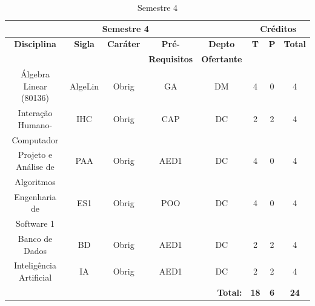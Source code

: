 \begin{table}[H]
\caption{Semestre 4}
\centering
\footnotesize
\begin{tabular}{|c|c|c|c|c|c|c|c|} %
\hline
\hline
\multicolumn{5}{|c|}{\textbf{Semestre 4}}  &  \multicolumn{3}{|c|}{\textbf{Créditos}} \\
\hline
\hline
\textbf{Disciplina} & \textbf{Sigla} & \textbf{Caráter} & \textbf{Pré-} & \textbf{Depto} &  \textbf{T}  &  \textbf{P}  & \textbf{Total} \\ 
& & & \textbf{Requisitos}  & \textbf{Ofertante} & & & \\
\hline 
Álgebra Linear (80136) & AlgeLin & Obrig & GA & DM  & 4 & 0 & 4 \\
\hline

Interação Humano- & IHC & Obrig & CAP & DC & 2 & 2 & 4 \\
Computador & & & & & & & \\

\hline
Projeto e Análise de & PAA & Obrig & AED1 & DC  & 4 & 0 & 4 \\
Algoritmos & & & & & & & \\
\hline
Engenharia de  & ES1 & Obrig & POO & DC  & 4 & 0 & 4 \\
Software 1 & & & & & & & \\
\hline
Banco de Dados & BD & Obrig & AED1 & DC  & 2 & 2 & 4 \\
\hline
Inteligência Artificial & IA & Obrig & AED1 & DC & 2 & 2 & 4 \\
\hline

\hline
\hline
\multicolumn{5}{|r|}{\textbf{Total:}}  &  \textbf{18}  &  \textbf{6}   & \textbf{24} \\ %
\hline
\hline
\end{tabular}
\label{tab:matriz4}
\end{table}





